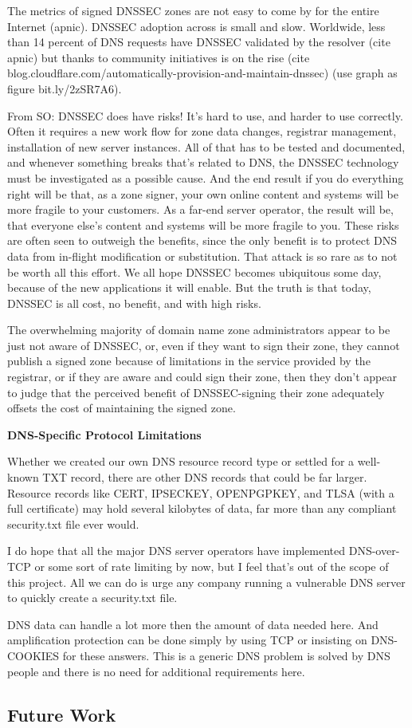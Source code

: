 The metrics of signed DNSSEC zones are not easy to come by for the entire
Internet (apnic). DNSSEC adoption across is small and slow. Worldwide, less than
14 percent of DNS requests have DNSSEC validated by the resolver (cite apnic)
but thanks to community initiatives is on the rise (cite
blog.cloudflare.com/automatically-provision-and-maintain-dnssec) (use graph as
figure bit.ly/2zSR7A6).

From SO: DNSSEC does have risks! It's hard to use, and harder to use correctly.
Often it requires a new work flow for zone data changes, registrar management,
installation of new server instances. All of that has to be tested and
documented, and whenever something breaks that's related to DNS, the DNSSEC
technology must be investigated as a possible cause. And the end result if you
do everything right will be that, as a zone signer, your own online content and
systems will be more fragile to your customers. As a far-end server operator,
the result will be, that everyone else's content and systems will be more
fragile to you. These risks are often seen to outweigh the benefits, since the
only benefit is to protect DNS data from in-flight modification or substitution.
That attack is so rare as to not be worth all this effort. We all hope DNSSEC
becomes ubiquitous some day, because of the new applications it will enable. But
the truth is that today, DNSSEC is all cost, no benefit, and with high risks.

The overwhelming majority of domain name zone administrators appear to be just
not aware of DNSSEC, or, even if they want to sign their zone, they cannot
publish a signed zone because of limitations in the service provided by the
registrar, or if they are aware and could sign their zone, then they don’t
appear to judge that the perceived benefit of DNSSEC-signing their zone
adequately offsets the cost of maintaining the signed zone.

\textbf{DNS-Specific Protocol Limitations}

Whether we created our own DNS resource record type or settled for a well-known
TXT record, there are other DNS records that could be far larger. Resource
records like CERT, IPSECKEY, OPENPGPKEY, and TLSA (with a full certificate) may
hold several kilobytes of data, far more than any compliant security.txt file
ever would.

I do hope that all the major DNS server operators have implemented DNS-over-TCP
or some sort of rate limiting by now, but I feel that's out of the scope of this
project. All we can do is urge any company running a vulnerable DNS server to
quickly create a security.txt file.

DNS data can handle a lot more then the amount of data needed here. And
amplification protection can be done simply by using TCP or insisting on
DNS-COOKIES for these answers. This is a generic DNS problem is solved by DNS
people and there is no need for additional requirements here.

\subsection{Future Work}

